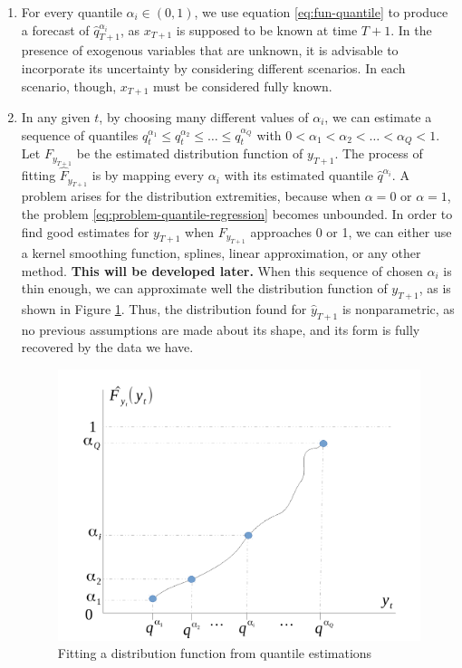 \begin{enumerate}
	

\item For every quantile $\alpha_i \in (0,1)$, we use equation \ref{eq:fun-quantile} to produce a forecast of $\hat{q}^{\alpha_i}_{T+1}$, as $x_{T+1}$ is supposed to be known at time $T+1$. In the presence of exogenous variables that are unknown, it is advisable to incorporate its uncertainty by considering different scenarios. In each scenario, though, $x_{T+1}$ must be considered fully known. 

\item In any given $t$, by choosing many different values of $\alpha_i$, we can estimate a sequence of quantiles $q^{\alpha_1}_{t} \leq q^{\alpha_2}_{t} \leq \dots \leq q^{\alpha_Q}_{t}$ with $0 < \alpha_1 < \alpha_2 < \dots < \alpha_Q < 1$. 
Let $F_{y_{T+1}}$ be the estimated distribution function of ${y}_{T+1}$. 
The process of fitting $\hat{F}_{y_{T+1}}$ is by mapping every $\alpha_i$ with its estimated quantile $\hat{q}^{\alpha_i}$. A problem arises for the distribution extremities, because when $\alpha = 0$ or $\alpha = 1$, the problem \ref{eq:problem-quantile-regression} becomes unbounded.
In order to find good estimates for $y_{T+1}$ when $F_{y_{T+1}}$ approaches 0 or 1, we can either use a kernel smoothing function, splines, linear approximation, or any other method. 
\textbf{This will be developed later.}
When this sequence of chosen $\alpha_i$ is thin enough, we can approximate well the distribution function of $y_{T+1}$, as is shown in Figure \ref{fig:grafico-quantis}. 
Thus, the distribution found for $\hat{y}_{T+1}$ is nonparametric, as no previous assumptions are made about its shape, and its form is fully recovered by the data we have.

\begin{figure}[h]
\centering
\includegraphics[width=0.7\linewidth]{./Figuras/grafico-quantis}
\caption{Fitting a distribution function from quantile estimations}
\label{fig:grafico-quantis}
\end{figure}



\end{enumerate}
